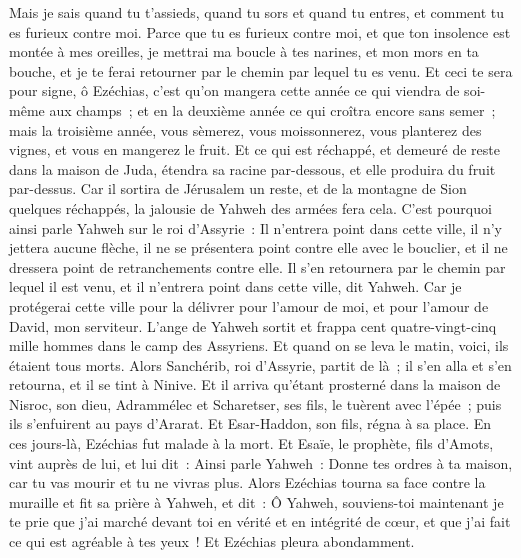 \begin{multicols}{2}
Mais je sais quand tu t'assieds, quand tu sors et quand tu entres, et comment tu es furieux contre moi.
Parce que tu es furieux contre moi, et que ton insolence est montée à mes oreilles, je mettrai ma boucle à tes narines, et mon mors en ta bouche, et je te ferai retourner par le chemin par lequel tu es venu.
Et ceci te sera pour signe, ô Ezéchias, c'est qu'on mangera cette année ce qui viendra de soi-même aux champs~; et en la deuxième année ce qui croîtra encore sans semer~; mais la troisième année, vous sèmerez, vous moissonnerez, vous planterez des vignes, et vous en mangerez le fruit.
Et ce qui est réchappé, et demeuré de reste dans la maison de Juda, étendra sa racine par-dessous, et elle produira du fruit par-dessus.
Car il sortira de Jérusalem un reste, et de la montagne de Sion quelques réchappés, la jalousie de Yahweh des armées fera cela.
C'est pourquoi ainsi parle Yahweh sur le roi d'Assyrie~: Il n'entrera point dans cette ville, il n'y jettera aucune flèche, il ne se présentera point contre elle avec le bouclier, et il ne dressera point de retranchements contre elle.
Il s'en retournera par le chemin par lequel il est venu, et il n'entrera point dans cette ville, dit Yahweh.
Car je protégerai cette ville pour la délivrer pour l'amour de moi, et pour l'amour de David, mon serviteur.
L'ange de Yahweh sortit et frappa cent quatre-vingt-cinq mille hommes dans le camp des Assyriens. Et quand on se leva le matin, voici, ils étaient tous morts.
Alors Sanchérib, roi d'Assyrie, partit de là~; il s'en alla et s'en retourna, et il se tint à Ninive.
Et il arriva qu'étant prosterné dans la maison de Nisroc, son dieu, Adrammélec et Scharetser, ses fils, le tuèrent avec l'épée~; puis ils s'enfuirent au pays d'Ararat. Et Esar-Haddon, son fils, régna à sa place.
\VerseOne{}En ces jours-là, Ezéchias fut malade à la mort. Et Esaïe, le prophète, fils d'Amots, vint auprès de lui, et lui dit~: Ainsi parle Yahweh~: Donne tes ordres à ta maison, car tu vas mourir et tu ne vivras plus.
Alors Ezéchias tourna sa face contre la muraille et fit sa prière à Yahweh,
et dit~: Ô Yahweh, souviens-toi maintenant je te prie que j'ai marché devant toi en vérité et en intégrité de cœur, et que j'ai fait ce qui est agréable à tes yeux~! Et Ezéchias pleura abondamment.

\end{multicols}

